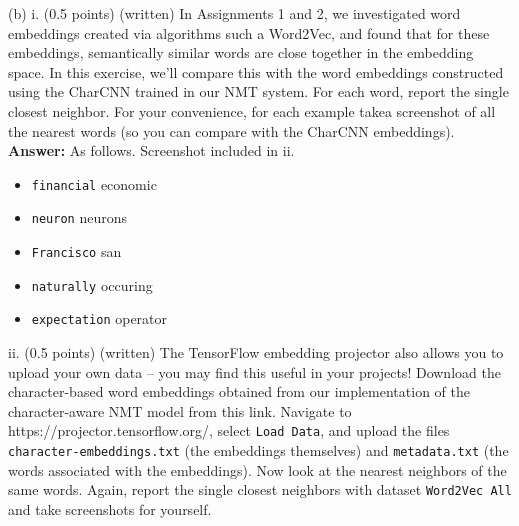 \documentclass{article}
\begin{document}
\bigbreak
\noindent
(b) i. (0.5 points) (written) In Assignments 1 and 2, we investigated word embeddings created via algorithms such a Word2Vec, and found that for these embeddings, semantically similar words are close together in the embedding space. In this exercise, we’ll compare this with the word embeddings constructed using the CharCNN trained in our NMT system. For each word, report the single closest neighbor.  For your convenience, for each example takea screenshot of all the nearest words (so you can compare with the CharCNN embeddings).
\bigbreak
\noindent
\textbf{Answer:} As follows. Screenshot included in ii.
\begin{itemize}
    \item \verb|financial| \textrightarrow{} economic
    \item \verb|neuron| \textrightarrow{} neurons
    \item \verb|Francisco| \textrightarrow{} san
    \item \verb|naturally| \textrightarrow{} occuring
    \item \verb|expectation| \textrightarrow{} operator
\end{itemize}

\bigbreak
\noindent
ii. (0.5 points)  (written) The TensorFlow embedding projector also allows you to upload your own data – you may find this useful in your projects! Download  the  character-based  word  embeddings  obtained  from  our  implementation  of  the character-aware NMT model from this link. Navigate to https://projector.tensorflow.org/, select \verb|Load Data|, and upload the files \verb|character-embeddings.txt| (the embeddings themselves) and \verb|metadata.txt| (the words associated with the embeddings). 
Now look at the nearest neighbors of the same words.  Again, report the single closest neighbors with dataset \verb|Word2Vec All| and take screenshots for yourself.
\end{document}
